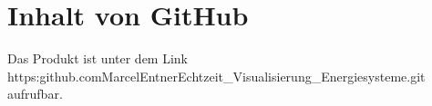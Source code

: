 \section{Inhalt von GitHub}
Das Produkt ist unter dem Link https:\/\/github.com\/MarcelEntner\/Echtzeit\_Visualisierung\_Energiesysteme.git  aufrufbar.






